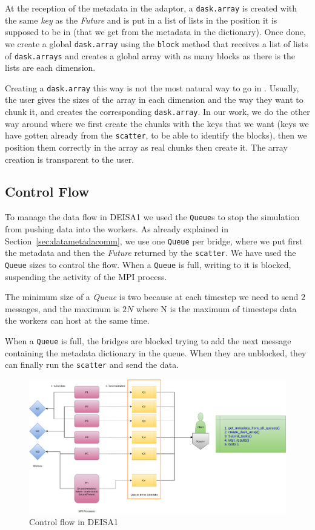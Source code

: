 At the reception of the metadata in the \deisa adaptor, a \texttt{dask.array} is created with the same \textit{key} as the \textit{Future} and is put in a list of lists in the position it is supposed to be in (that we get from the metadata in the dictionary). Once done, we create a global \texttt{dask.array} using the \texttt{block} method that receives a list of lists of \texttt{dask.arrays} and creates a global array with as many blocks as there is the lists are each dimension.  

Creating a \texttt{dask.array} this way is not the most natural way to go in \dask. Usually, the user gives \dask the sizes of the array in each dimension and the way they want to chunk it, and \dask creates the corresponding \texttt{dask.array}. 
In our work, we do the other way around where we first create the chunks with the keys that we want (keys we have gotten already from the \texttt{scatter}, to be able to identify the blocks), then we position them correctly in the array as real chunks then create it.
The array creation is transparent to the user.  

\subsection{Control Flow}\label{sec:controlflow}

To manage the data flow in DEISA1 we used the \texttt{Queue}s to stop the simulation from pushing data into the \dask workers. 
As already explained in Section~\ref{sec:datametadacomm}, we use one \texttt{Queue} per bridge, where we put first the metadata and then the \textit{Future} returned by the \texttt{scatter}. We have used the \texttt{Queue} sizes to control the flow. When a \texttt{Queue} is full, writing to it is blocked, suspending the activity of the MPI process.

The minimum size of a \textit{Queue} is two because at each timestep we need to send $2$ messages, and the maximum is $2N$ where N is the maximum of timesteps data the workers can host at the same time. 

When a \texttt{Queue} is full, the bridges are blocked trying to add the next message containing the metadata dictionary in the queue. When they are unblocked, they can finally run the \texttt{scatter} and send the data. 

\begin{figure}\centering
\includegraphics[width=\columnwidth]{figures/controlflow.pdf}
\caption{Control flow in DEISA1}
\label{figdataflow}
\end{figure}

